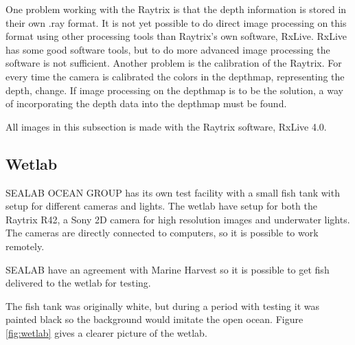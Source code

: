 One problem working with the Raytrix is that the depth information is stored in their own .ray format. It is not yet possible to do direct image processing on this format using other processing tools than Raytrix's own software, RxLive. RxLive has some good software tools, but to do more advanced image processing the software is not sufficient.
Another problem is the calibration of the Raytrix. For every time the camera is calibrated the colors in the depthmap, representing the depth, change. If image processing on the depthmap is to be the solution, a way of incorporating the depth data into the depthmap must be found.

All images in this subsection is made with the Raytrix software, RxLive 4.0.




\subsection{Wetlab}\label{wetlab}

SEALAB OCEAN GROUP has its own test facility with a small fish tank with setup for different cameras and lights. The wetlab have setup for both the Raytrix R42, a Sony 2D camera for high resolution images and underwater lights. The cameras are directly connected to computers, so it is possible to work remotely.

SEALAB have an agreement with Marine Harvest so it is possible to get fish delivered to the wetlab for testing.

The fish tank was originally white, but during a period with testing it was painted black so the background would imitate the open ocean. Figure \ref{fig:wetlab} gives a clearer picture of the wetlab.

